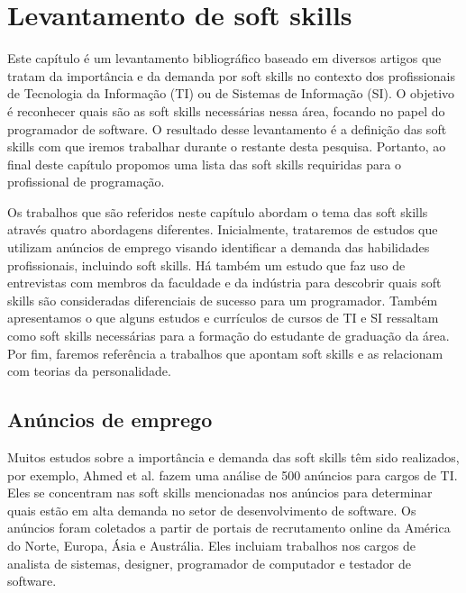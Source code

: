 

\chapter{Levantamento de soft skills}

\label{chap:research}

Este capítulo é um levantamento bibliográfico baseado em diversos artigos que tratam da importância e da demanda por soft skills no contexto dos profissionais de Tecnologia da Informação (TI) ou de Sistemas de Informação (SI). O objetivo é reconhecer quais são as soft skills necessárias nessa área, focando no papel do programador de software. O resultado desse levantamento é a definição das soft skills com que iremos trabalhar durante o restante desta pesquisa. Portanto, ao final deste capítulo propomos uma lista das soft skills requiridas para o profissional de programação.

Os trabalhos que são referidos neste capítulo abordam o tema das soft skills através quatro abordagens diferentes. Inicialmente, trataremos de estudos que utilizam anúncios de emprego visando identificar a demanda das habilidades profissionais, incluindo soft skills. Há também um estudo que faz uso de entrevistas com membros da faculdade e da indústria para descobrir quais soft skills são consideradas diferenciais de sucesso para um programador. Também apresentamos o que alguns estudos e currículos de cursos de TI e SI ressaltam como soft skills necessárias para a formação do estudante de graduação da área. Por fim, faremos referência a trabalhos que apontam soft skills e as relacionam com teorias da personalidade.

\section{Anúncios de emprego}

Muitos estudos sobre a importância e demanda das soft skills têm sido realizados, por exemplo, Ahmed et al. \cite{ahmed:12} fazem uma análise de 500 anúncios para cargos de TI. Eles se concentram nas soft skills mencionadas nos anúncios para determinar quais estão em alta demanda no setor de desenvolvimento de software. Os anúncios foram coletados a partir de portais de recrutamento online da América do Norte, Europa, Ásia e Austrália. Eles incluiam trabalhos nos cargos de analista de sistemas, designer, programador de computador e testador de software.

